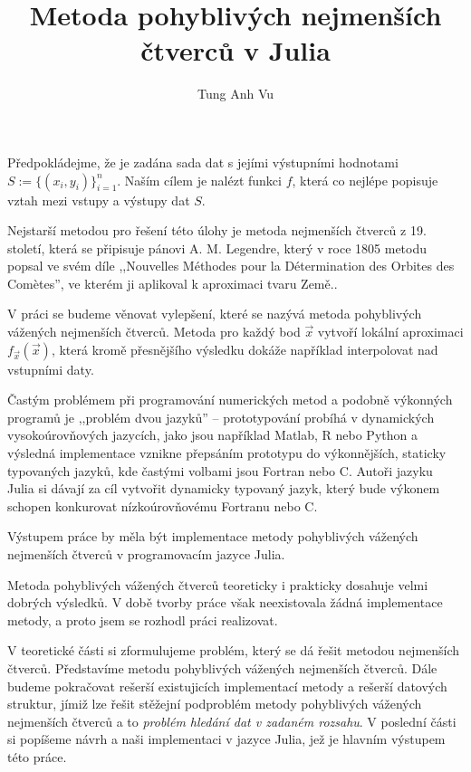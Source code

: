\documentclass[thesis=B,czech]{FITthesis}[2012/06/26]
\title{Metoda pohyblivých nejmenších čtverců v Julia}
\author{Tung Anh Vu} %
\theoremstyle{newthm}
\begin{document}

\begin{introduction}
Předpokládejme, že je zadána sada dat s jejími výstupními hodnotami $S := \{(x_i, y_i)\}_{i = 1}^n$. Naším cílem je nalézt funkci $f$, která co nejlépe popisuje vztah mezi vstupy a výstupy dat $S$.

Nejstarší metodou pro řešení této úlohy je metoda nejmenších čtverců z 19. století, která se připisuje pánovi A. M. Legendre, který v roce 1805 metodu popsal ve svém díle ,,Nouvelles Méthodes pour la Détermination des Orbites des Com\`etes'', ve kterém ji aplikoval k aproximaci tvaru Země.\cite[s.~12--14]{history_of_statistics}.

V práci se budeme věnovat vylepšení, které se nazývá metoda pohyblivých vážených nejmenších čtverců. Metoda pro každý bod $\vec{x}$ vytvoří lokální aproximaci $f_{\vec{x}}(\vec{x})$, která kromě přesnějšího výsledku dokáže například interpolovat nad vstupními daty.

Častým problémem při programování numerických metod a podobně výkonných programů je ,,problém dvou jazyků'' -- prototypování probíhá v dynamických vysokoúrovňových jazycích, jako jsou například Matlab, R nebo Python a výsledná implementace vznikne přepsáním prototypu do výkonnějších, staticky typovaných jazyků, kde častými volbami jsou Fortran nebo C. Autoři jazyku Julia si dávají za cíl vytvořit dynamicky typovaný jazyk, který bude výkonem schopen konkurovat nízkoúrovňovému Fortranu nebo C.\cite{julia}

Výstupem práce by měla být implementace metody pohyblivých vážených nejmenších čtverců v programovacím jazyce Julia.

Metoda pohyblivých vážených čtverců teoreticky i prakticky dosahuje velmi dobrých výsledků.\cite{surfaces-mwls, mwls-approximation-power} V době tvorby práce však neexistovala žádná implementace metody, a proto jsem se rozhodl práci realizovat.

V teoretické části si zformulujeme problém, který se dá řešit metodou nejmenších čtverců. Představíme metodu pohyblivých vážených nejmenších čtverců. Dále budeme pokračovat rešerší existujicích implementací metody a rešerší datových struktur, jímiž lze řešit stěžejní podproblém metody pohyblivých vážených nejmenších čtverců a to \textit{problém hledání dat v zadaném rozsahu}. V poslední části si popíšeme návrh a naši implementaci v jazyce Julia, jež je hlavním výstupem této práce.
\end{introduction}
\end{document}
